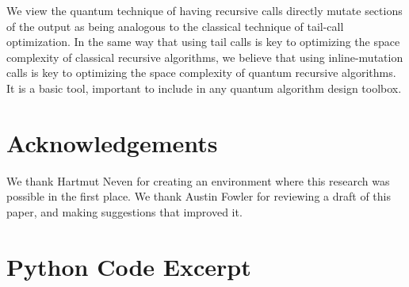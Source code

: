 \documentclass[onecolumn]{quantumarticle}
\begin{document}
We view the quantum technique of having recursive calls directly mutate sections of the output as being analogous to the classical technique of tail-call optimization.
In the same way that using tail calls is key to optimizing the space complexity of classical recursive algorithms, we believe that using inline-mutation calls is key to optimizing the space complexity of quantum recursive algorithms.
It is a basic tool, important to include in any quantum algorithm design toolbox.


\section{Acknowledgements}

We thank Hartmut Neven for creating an environment where this research was possible in the first place.
We thank Austin Fowler for reviewing a draft of this paper, and making suggestions that improved it.





\appendix

\section{Python Code Excerpt}
\label{app:python}
\end{document}
